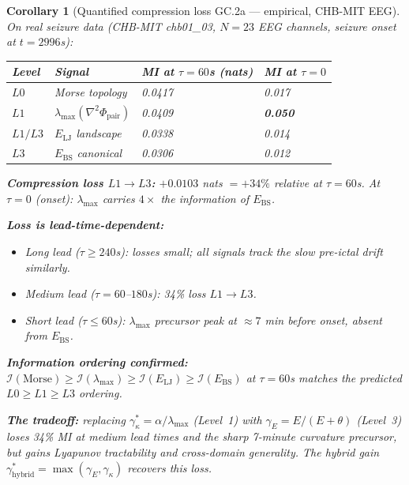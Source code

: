 \documentclass[11pt,a4paper]{article}
\newtheorem{corollary}[theorem]{Corollary}
\theoremstyle{definition}
\begin{document}
\begin{corollary}[Quantified compression loss GC.2a --- empirical, CHB-MIT EEG]
\label{cor:compression_loss}
On real seizure data (CHB-MIT chb01\_03, $N=23$ EEG channels, seizure onset at $t=2996$s):

\begin{center}
\renewcommand{\arraystretch}{1.3}
\begin{tabular}{llll}
\toprule
\textbf{Level} & \textbf{Signal} & \textbf{MI at $\tau=60$s (nats)} & \textbf{MI at $\tau=0$} \\
\midrule
$L0$ & Morse topology & 0.0417 & 0.017 \\
$L1$ & $\lambda_\mathrm{max}(\nabla^2\Phi_\mathrm{pair})$ & 0.0409 & \textbf{0.050} \\
$L1/L3$ & $E_\mathrm{LJ}$ landscape & 0.0338 & 0.014 \\
$L3$ & $E_\mathrm{BS}$ canonical & 0.0306 & 0.012 \\
\bottomrule
\end{tabular}
\end{center}

\textbf{Compression loss $L1 \to L3$:} $+0.0103$ nats $= +34\%$ relative at $\tau=60$s.
At $\tau=0$ (onset): $\lambda_\mathrm{max}$ carries $4\times$ the information of $E_\mathrm{BS}$.

\textbf{Loss is lead-time-dependent:}
\begin{itemize}
\item Long lead ($\tau \geq 240$s): losses small; all signals track the slow pre-ictal drift similarly.
\item Medium lead ($\tau = 60$--$180$s): 34\% loss $L1 \to L3$.
\item Short lead ($\tau \leq 60$s): $\lambda_\mathrm{max}$ precursor peak at $\approx 7$ min before onset, absent from $E_\mathrm{BS}$.
\end{itemize}

\textbf{Information ordering confirmed:} $\mathcal{I}(\text{Morse}) \geq \mathcal{I}(\lambda_\mathrm{max}) \geq \mathcal{I}(E_\mathrm{LJ}) \geq \mathcal{I}(E_\mathrm{BS})$ at $\tau=60$s matches the predicted $L0 \geq L1 \geq L3$ ordering.

\textbf{The tradeoff:} replacing $\gamma^*_\kappa = \alpha/\lambda_\mathrm{max}$ (Level~1) with
$\gamma_E = E/(E+\theta)$ (Level~3) loses 34\% MI at medium lead times and the sharp
7-minute curvature precursor, but gains Lyapunov tractability and cross-domain generality.
The hybrid gain $\gamma^*_\mathrm{hybrid} = \max(\gamma_E, \gamma_\kappa)$ recovers this loss.
\end{corollary}
\end{document}
